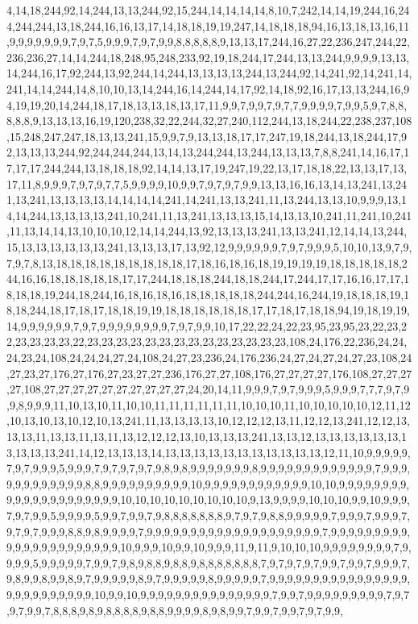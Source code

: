 4,14,18,244,92,14,244,13,13,244,92,15,244,14,14,14,14,8,10,7,242,14,14,19,244,16,244,244,244,13,18,244,16,16,13,17,14,18,18,19,19,247,14,18,18,18,94,16,13,18,13,16,11,9,9,9,9,9,9,9,7,9,7,5,9,9,9,7,9,7,9,9,8,8,8,8,8,9,13,13,17,244,16,27,22,236,247,244,22,236,236,27,14,14,244,18,248,95,248,233,92,19,18,244,17,244,13,13,244,9,9,9,9,13,13,14,244,16,17,92,244,13,92,244,14,244,13,13,13,13,244,13,244,92,14,241,92,14,241,14,241,14,14,244,14,8,10,10,13,14,244,16,14,244,14,17,92,14,18,92,16,17,13,13,244,16,94,19,19,20,14,244,18,17,18,13,13,18,13,17,11,9,9,7,9,9,7,9,7,7,9,9,9,9,7,9,9,5,9,7,8,8,8,8,8,9,13,13,13,16,19,120,238,32,22,244,32,27,240,112,244,13,18,244,22,238,237,108,15,248,247,247,18,13,13,241,15,9,9,7,9,13,13,18,17,17,247,19,18,244,13,18,244,17,92,13,13,13,244,92,244,244,244,13,14,13,244,244,13,244,13,13,13,7,8,8,241,14,16,17,17,17,17,244,244,13,18,18,18,92,14,14,13,17,19,247,19,22,13,17,18,18,22,13,13,17,13,17,11,8,9,9,9,7,9,7,9,7,7,5,9,9,9,9,10,9,9,7,9,7,9,7,9,9,13,13,16,16,13,14,13,241,13,241,13,241,13,13,13,13,14,14,14,14,241,14,241,13,13,241,11,13,244,13,13,10,9,9,9,13,14,14,244,13,13,13,13,241,10,241,11,13,241,13,13,13,15,14,13,13,10,241,11,241,10,241,11,13,14,14,13,10,10,10,12,14,14,244,13,92,13,13,13,241,13,13,241,12,14,14,13,244,15,13,13,13,13,13,13,241,13,13,13,17,13,92,12,9,9,9,9,9,9,7,9,7,9,9,9,5,10,10,13,9,7,9,7,9,7,8,13,18,18,18,18,18,18,18,18,18,17,18,16,18,16,18,19,19,19,19,18,18,18,18,18,244,16,16,18,18,18,18,18,17,17,244,18,18,18,244,18,18,244,17,244,17,17,16,16,17,17,18,18,18,19,244,18,244,16,18,16,18,16,18,18,18,18,18,244,244,16,244,19,18,18,18,19,18,18,244,18,17,18,17,18,18,19,19,18,18,18,18,18,18,17,17,18,17,18,18,94,19,18,19,19,14,9,9,9,9,9,9,7,9,7,9,9,9,9,9,9,9,9,7,9,7,9,9,10,17,22,22,24,22,23,95,23,95,23,22,23,22,23,23,23,23,22,23,23,23,23,23,23,23,23,23,23,23,23,23,23,108,24,176,22,236,24,24,24,23,24,108,24,24,24,27,24,108,24,27,23,236,24,176,236,24,27,24,27,24,27,23,108,24,27,23,27,176,27,176,27,23,27,27,236,176,27,27,108,176,27,27,27,27,176,108,27,27,27,27,108,27,27,27,27,27,27,27,27,27,27,24,20,14,11,9,9,9,7,9,7,9,9,9,5,9,9,9,7,7,7,9,7,9,9,8,9,9,9,11,10,13,10,11,10,10,11,11,11,11,11,11,10,10,10,11,10,10,10,10,10,12,11,12,10,13,10,13,10,12,10,13,241,11,13,13,13,13,10,12,12,12,13,11,12,12,13,241,12,12,13,13,13,11,13,13,11,13,11,13,12,12,12,13,10,13,13,13,241,13,13,12,13,13,13,13,13,13,13,13,13,13,241,14,12,13,13,13,14,13,13,13,13,13,13,13,13,13,13,13,12,11,10,9,9,9,9,9,7,9,7,9,9,9,5,9,9,9,7,9,7,9,7,9,7,9,8,9,8,9,9,9,9,9,9,9,8,9,9,9,9,9,9,9,9,9,9,9,9,9,7,9,9,9,9,9,9,9,9,9,9,9,9,8,8,9,9,9,9,9,9,9,9,9,9,10,9,9,9,9,9,9,9,9,9,9,9,9,10,10,9,9,9,9,9,9,9,9,9,9,9,9,9,9,9,9,9,9,9,9,9,10,10,10,10,10,10,10,10,10,9,13,9,9,9,9,10,10,10,9,9,10,9,9,9,7,9,7,9,9,5,9,9,9,9,5,9,9,7,9,9,7,9,8,8,8,8,8,8,8,9,7,9,7,9,8,8,9,9,9,9,9,7,9,9,9,7,9,9,9,7,9,7,9,7,9,9,9,8,8,9,8,9,9,9,9,7,9,9,9,9,9,9,9,9,9,9,9,9,9,9,9,9,9,9,9,9,7,9,9,9,9,9,9,9,9,9,9,9,9,9,9,9,9,9,9,9,9,9,9,10,9,9,9,10,9,9,10,9,9,9,11,9,11,9,10,10,10,9,9,9,9,9,9,9,9,7,9,9,9,9,5,9,9,9,9,9,7,9,9,7,9,8,9,8,8,9,8,8,9,8,8,8,8,8,8,8,7,9,7,9,7,9,7,9,9,7,9,9,7,9,9,9,7,9,8,9,9,8,9,9,8,9,7,9,9,9,9,9,8,9,7,9,9,9,9,9,8,9,9,9,9,9,7,9,9,9,9,9,9,9,9,9,9,9,9,9,9,9,9,9,9,9,9,9,9,9,9,9,9,10,9,9,10,9,9,9,9,9,9,9,9,9,9,9,9,9,9,9,7,9,9,7,9,9,9,9,9,9,9,9,9,7,9,7,9,7,9,9,7,8,8,8,9,8,9,8,8,8,8,9,8,8,9,9,9,9,8,9,8,9,9,7,9,9,7,9,9,7,9,7,9,9,